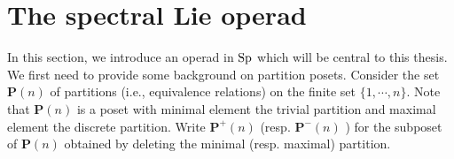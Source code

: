 



%
%
%
%
\section{The spectral Lie operad}
\label{The spectral Lie operad}
In this section, we introduce an operad in $\operatorname{Sp}$ which will be central to this thesis. 
We first need to provide some background on partition posets. 
Consider the set $\mathbf{P}(n)$ of partitions (i.e., equivalence relations) on the finite set $\{1, \cdots, n \}$. Note that $\mathbf{P}(n)$ is a poset with minimal element the trivial partition and maximal element the discrete partition.
Write $\mathbf{P}^{+}(n)$ (resp. $\mathbf{P}^{-}(n)$ ) for the subposet of $\mathbf{P}(n)$ obtained by deleting the minimal (resp. maximal) partition.

